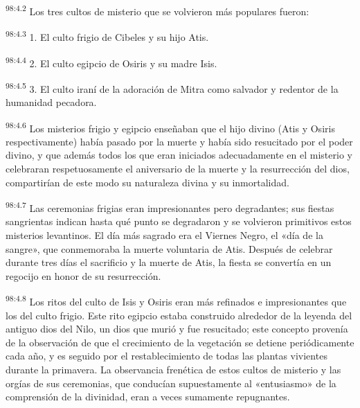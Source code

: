 \par
\textsuperscript{98:4.2} Los tres cultos de misterio que se volvieron más populares fueron:

\par
\textsuperscript{98:4.3} 1. El culto frigio de Cibeles y su hijo Atis.

\par
\textsuperscript{98:4.4} 2. El culto egipcio de Osiris y su madre Isis.

\par
\textsuperscript{98:4.5} 3. El culto iraní de la adoración de Mitra como salvador y redentor de la humanidad pecadora.

\par
\textsuperscript{98:4.6} Los misterios frigio y egipcio enseñaban que el hijo divino (Atis y Osiris respectivamente) había pasado por la muerte y había sido resucitado por el poder divino, y que además todos los que eran iniciados adecuadamente en el misterio y celebraran respetuosamente el aniversario de la muerte y la resurrección del dios, compartirían de este modo su naturaleza divina y su inmortalidad.

\par
\textsuperscript{98:4.7} Las ceremonias frigias eran impresionantes pero degradantes; sus fiestas sangrientas indican hasta qué punto se degradaron y se volvieron primitivos estos misterios levantinos. El día más sagrado era el Viernes Negro, el «día de la sangre», que conmemoraba la muerte voluntaria de Atis. Después de celebrar durante tres días el sacrificio y la muerte de Atis, la fiesta se convertía en un regocijo en honor de su resurrección.

\par
\textsuperscript{98:4.8} Los ritos del culto de Isis y Osiris eran más refinados e impresionantes que los del culto frigio. Este rito egipcio estaba construido alrededor de la leyenda del antiguo dios del Nilo, un dios que murió y fue resucitado; este concepto provenía de la observación de que el crecimiento de la vegetación se detiene periódicamente cada año, y es seguido por el restablecimiento de todas las plantas vivientes durante la primavera. La observancia frenética de estos cultos de misterio y las orgías de sus ceremonias, que conducían supuestamente al «entusiasmo» de la comprensión de la divinidad, eran a veces sumamente repugnantes.

